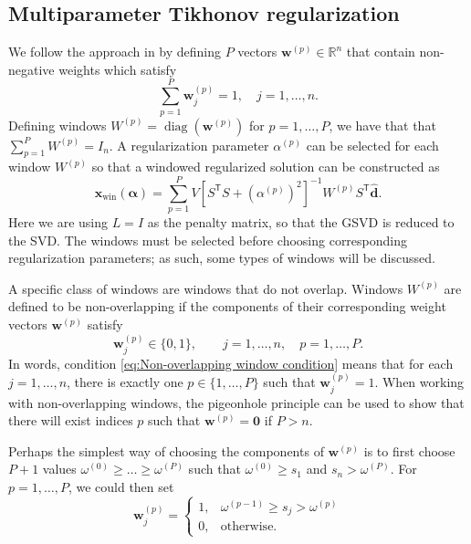 \documentclass[12pt]{article}
\newcommand{\dVec}{\mathbf{d}}	%
\newcommand{\xVec}{\mathbf{x}}	%
\newcommand{\wVec}{\mathbf{w}}	%
\newcommand{\trans}[1]{{#1}^\mathsf{T}}	%
\newcommand{\inv}[1]{{#1}^{-1}}	%
\DeclareMathOperator{\diag}{diag}	%
\newcommand{\dft}[1]{\widehat{#1}}	%
\newcommand{\regparam}{\alpha}  %
\newcommand{\regparamVec}{\bm{\regparam}}   %
\newcommand{\xWin}{\xVec_{\text{win}}}	%
\newcommand{\zeroVec}{\bm{0}}	%
\newcommand{\singular}{s}	%
\begin{document}
\subsection{Multiparameter Tikhonov regularization} \label{sec:Multiparameter}
We follow the approach in \cite{ChungEasleyOLeary} by defining $P$ vectors $\wVec^{(p)} \in \mathbb{R}^n$ that contain non-negative weights which satisfy
\begin{equation}
\label{eq:Weights}
\sum_{p=1}^{P} \wVec_j^{(p)} = 1, \quad j = 1,\ldots,n.
\end{equation}
Defining windows $W^{(p)} = \diag\left(\wVec^{(p)}\right)$ for $p = 1,\ldots,P$, we have that that $\sum_{p=1}^P W^{(p)} = I_n$. A regularization parameter $\regparam^{(p)}$ can be selected for each window $W^{(p)}$ so that a windowed regularized solution can be constructed as
\begin{equation}
\label{eq:TikSolWindow}
\xWin(\regparamVec) = \sum_{p=1}^P V\inv{\left[\trans{S}S + (\regparam^{(p)})^2\right]}W^{(p)}\trans{S}\dft{\dVec}.
\end{equation}
Here we are using $L = I$ as the penalty matrix, so that the GSVD is reduced to the SVD. The windows must be selected before choosing corresponding regularization parameters; as such, some types of windows will be discussed. \par
A specific class of windows are windows that do not overlap. Windows $W^{(p)}$ are defined to be non-overlapping if the components of their corresponding weight vectors $\wVec^{(p)}$ satisfy
\begin{equation}
\label{eq:Non-overlapping window condition}
    \wVec_j^{(p)} \in \{0,1\}, \qquad j = 1,\ldots,n, \quad p = 1,\ldots,P.
\end{equation}
In words, condition \eqref{eq:Non-overlapping window condition} means that for each $j = 1,\ldots,n$, there is exactly one $p \in \{1,\ldots,P\}$ such that $\wVec_j^{(p)} = 1$. When working with non-overlapping windows, the pigeonhole principle \cite{DummitFoote3} can be used to show that there will exist indices $p$ such that $\wVec^{(p)} = \zeroVec$ if $P > n$. \par
Perhaps the simplest way of choosing the components of $\wVec^{(p)}$ is to first choose $P+1$ values $\omega^{(0)} \geq \ldots \geq \omega^{(P)}$ such that $\omega^{(0)} \geq \singular_1$ and $\singular_n > \omega^{(P)}$. For $p = 1,\ldots,P$, we could then set
\begin{equation}
\label{eq:Non-overlapping windows}
\wVec_j^{(p)} = \begin{cases}
1, & \omega^{(p-1)} \geq \singular_j > \omega^{(p)} \\
0, & \text{otherwise.}
\end{cases}
\end{equation}
\end{document}
